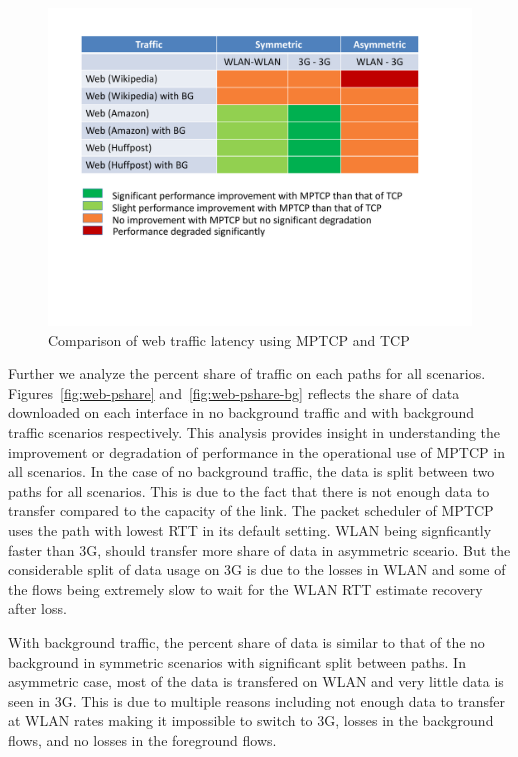 \begin{figure}[!th]
\begin{minipage}[t]{0.48\textwidth}
\begin{center}
\includegraphics[width=.98\linewidth]{plots/MPTCP-Web}
\end{center}
\caption{Comparison of web traffic latency using MPTCP and TCP}
  \label{fig:web-summary}
\end{minipage}
\end{figure}

Further we analyze the percent share of traffic on each paths for all scenarios. Figures~\ref{fig:web-pshare} and~\ref{fig:web-pshare-bg} reflects the 
share of data downloaded on each interface in no background traffic and with background traffic scenarios respectively. This analysis provides insight
in understanding the improvement or degradation of performance in the operational use of MPTCP in all scenarios. In the case of no background traffic,
the data is split between two paths for all scenarios. This is due to the fact that there is not enough data to transfer compared to the capacity of the
link. The packet scheduler of MPTCP uses the path with lowest RTT in its default setting. WLAN being signficantly faster than 3G, should transfer more share of data in asymmetric sceario. But the considerable split of data usage on 3G is due to the losses in WLAN and some of the flows being extremely
slow to wait for the WLAN RTT estimate recovery after loss.

With background traffic, the percent share of data is similar to that of the no background in symmetric scenarios with significant split between paths.
In asymmetric case, most of the data is transfered on WLAN and very little data is seen in 3G. This is due to multiple reasons including not enough data 
to transfer at WLAN rates making it impossible to switch to 3G, losses in the background flows, and no losses in the foreground flows.

